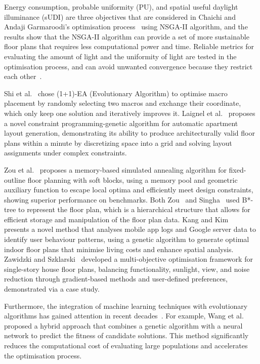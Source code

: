 \documentclass[]{article}
\begin{document}
Energy consumption, probable uniformity (PU), and spatial useful daylight illuminance (sUDI) are three objectives that are considered in Chaichi and Andaji Garmaroodi's optimisation process~\cite{CHAICHI2024108842} using NSGA-II algorithm, and the results show that the NSGA-II algorithm can provide a set of more sustainable floor plans that requires less computational power and time. Reliable metrics for evaluating the amount of light and the uniformity of light are tested in the optimisation process, and can avoid unwanted convergence because they restrict each other~\cite{CHAICHI2024108842}.

Shi et al.~\cite{10.5555/3666122.3666421} chose (1+1)-EA (Evolutionary Algorithm) to optimise macro placement by randomly selecting two macros and exchange their coordinate, which only keep one solution and iteratively improves it. Laignel et al.~\cite{LaignelGraziella2021Fpgt} proposes a novel constraint programming-genetic algorithm for automatic apartment layout generation, demonstrating its ability to produce architecturally valid floor plans within a minute by discretizing space into a grid and solving layout assignments under complex constraints.

Zou et al.~\cite{ZouDexuan2024Amsa} proposes a memory-based simulated annealing algorithm for fixed-outline floor planning with soft blocks, using a memory pool and geometric auxiliary function to escape local optima and efficiently meet design constraints, showing superior performance on benchmarks. Both Zou~\cite{ZouDexuan2024Amsa} and Singha~\cite{SinghaT.2012OoFu} used B*-tree to represent the floor plan, which is a hierarchical structure that allows for efficient storage and manipulation of the floor plan data.
Kang and Kim~\cite{KangShinjin2022Fpof} presents a novel method that analyses mobile app logs and Google server data to identify user behaviour patterns, using a genetic algorithm to generate optimal indoor floor plans that minimise living costs and enhance spatial analysis.
Zawidzki and Szklarski~\cite{ZawidzkiMachi2020Moot} developed a multi-objective optimisation framework for single-story house floor plans, balancing functionality, sunlight, view, and noise reduction through gradient-based methods and user-defined preferences, demonstrated via a case study.

Furthermore, the integration of machine learning techniques with evolutionary algorithms has gained attention in recent decades~\cite{HousseinEssamH.2021MAiP}. For example, Wang et al.~\cite{WANG20051329} proposed a hybrid approach that combines a genetic algorithm with a neural network to predict the fitness of candidate solutions. This method significantly reduces the computational cost of evaluating large populations and accelerates the optimisation process.
\end{document}
